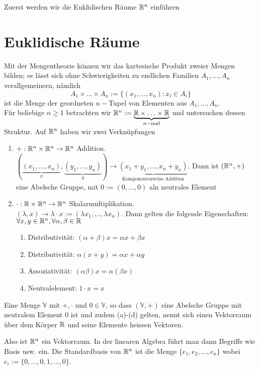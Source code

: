 \noindent Zuerst werden wir die Euklidischen Räume $\mathbb{R}^n$ einführen
\section{Euklidische Räume}
Mit der Mengentheorie können wir das kartesische Produkt zweier Mengen bilden; es lässt sich ohne Schwierigkeiten zu endlichen Familien $A_1,\dots ,A_n$ verallgemeinern, nämlich \[A_1\times\dots\times A_n:=\{\left(x_1,\dots ,x_n\right):x_i\in A_i \}\] ist die Menge der geordneten $n-$Tupel von Elementen aus $A_1,\dots ,A_n$.\\

Für beliebige $n\geq 1$ betrachten wir $ \mathbb{R}^n: = \underbrace {\mathbb{R} \times  \ldots  \times \mathbb{R} }_{n - {\text{mal}}}$ und untersuchen dessen Struktur. Auf $\mathbb{R}^n$ haben wir zwei Verknüpfungen
\begin{enumerate}
\item $+:\mathbb{R}^n\times\mathbb{R}^n\to\mathbb{R}^n$ Addition.\\
$\left( {\underbrace {\left( {{x_1}, \ldots ,{x_n}} \right)}_x,\underbrace {\left( {{y_1}, \ldots ,{y_n}} \right)}_y} \right) \to \underbrace {\left( {{x_1} + {y_1}, \ldots ,{x_n} + {y_n}} \right)}_{{\text{Komponentenweise Addition}}}$. Dann ist $\left( \mathbb{R}^n,+\right)$ eine Abelsche Gruppe, mit $0:=(0,\dots,0)$ aln neutrales Element
\item $\cdot:\mathbb{R}\times\mathbb{R}^n\to\mathbb{R}^n$ Skalarmultiplikation.\\
$(\lambda,x)\to\lambda\cdot x:=(\lambda x_1,\dots,\lambda x_n)$. Dann gelten die folgende Eigenschaften: $\forall x,y\in\mathbb{R}^n,\forall \alpha,\beta\in\mathbb{R}$

\begin{enumerate}
\item Distributivität: $\left( \alpha+\beta\right) x=\alpha x+\beta x$
\item Distributivität: $\alpha\left(x+y\right) = \alpha x+\alpha y$
\item Assoziativität: $\left( \alpha\beta\right) x=\alpha\left( \beta x\right)$
\item Neutralelement: $1\cdot x=x$
\end{enumerate}
\end{enumerate}

\begin{definition}{2.15}
Eine Menge $\mathbb{V}$ mit $+,\cdot$ und $0\in\mathbb{V}$, so dass $\left(\mathbb{V},+\right)$ eine Abelsche Gruppe mit neutralem Element 0 ist und zudem (a)-(d) gelten, nennt sich einen Vektorraum über dem Körper $\mathbb{R}$ und seine Elemente heissen Vektoren.
\end{definition}
Also ist $\mathbb{R}^n$ ein Vektorraum. In der linearen Algebra führt man dann Begriffe wie Basis usw. ein. Die Standardbasis von $\mathbb{R}^n$ ist die Menge $\{e_1,e_2,\dots,e_n \}$ wobei $e_i:=\{0,\dots,0,1,\dots,0\}$. \\

